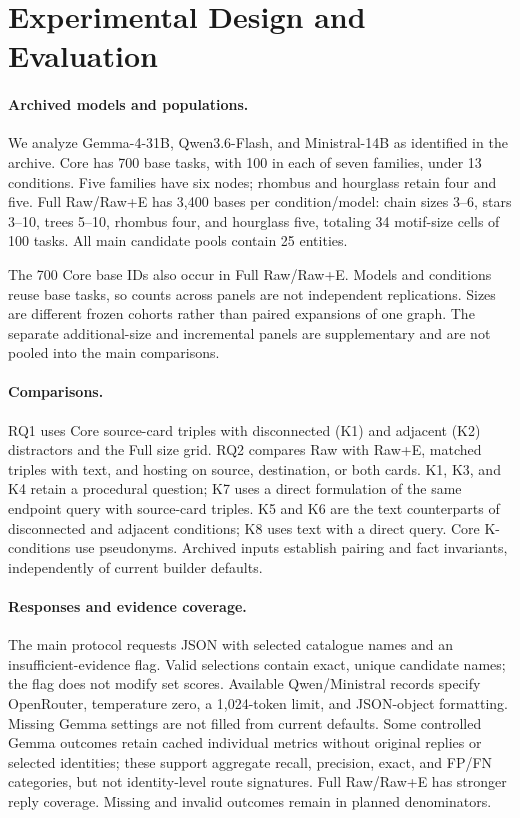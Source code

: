 \section{Experimental Design and Evaluation}
\label{sec:setup}
\paragraph{Archived models and populations.}
We analyze Gemma-4-31B, Qwen3.6-Flash, and Ministral-14B as identified in the archive. Core has 700 base tasks, with 100 in each of seven families, under 13 conditions. Five families have six nodes; rhombus and hourglass retain four and five. Full Raw/Raw+E has 3,400 bases per condition/model: chain sizes 3--6, stars 3--10, trees 5--10, rhombus four, and hourglass five, totaling 34 motif-size cells of 100 tasks. All main candidate pools contain 25 entities.

The 700 Core base IDs also occur in Full Raw/Raw+E. Models and conditions reuse base tasks, so counts across panels are not independent replications. Sizes are different frozen cohorts rather than paired expansions of one graph. The separate additional-size and incremental panels are supplementary and are not pooled into the main comparisons.

\paragraph{Comparisons.}
RQ1 uses Core source-card triples with disconnected (K1) and adjacent (K2) distractors and the Full size grid. RQ2 compares Raw with Raw+E, matched triples with text, and hosting on source, destination, or both cards. K1, K3, and K4 retain a procedural question; K7 uses a direct formulation of the same endpoint query with source-card triples. K5 and K6 are the text counterparts of disconnected and adjacent conditions; K8 uses text with a direct query. Core K-conditions use pseudonyms. Archived inputs establish pairing and fact invariants, independently of current builder defaults.

\paragraph{Responses and evidence coverage.}
The main protocol requests JSON with selected catalogue names and an insufficient-evidence flag. Valid selections contain exact, unique candidate names; the flag does not modify set scores. Available Qwen/Ministral records specify OpenRouter, temperature zero, a 1,024-token limit, and JSON-object formatting. Missing Gemma settings are not filled from current defaults. Some controlled Gemma outcomes retain cached individual metrics without original replies or selected identities; these support aggregate recall, precision, exact, and FP/FN categories, but not identity-level route signatures. Full Raw/Raw+E has stronger reply coverage. Missing and invalid outcomes remain in planned denominators.

